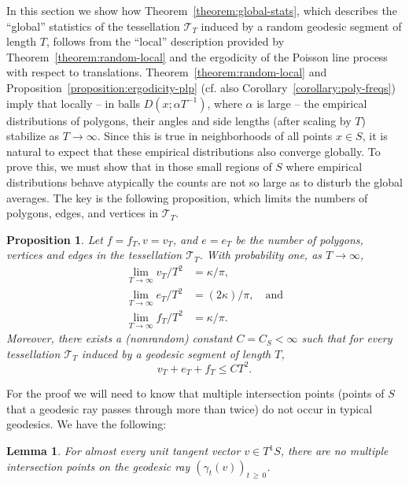\documentclass[10pt]{amsart}
\newtheorem{lemm}[theo]{Lemma}\newtheorem{prop}[theo]{Proposition}\newtheorem{coro}[theo]{Corollary}\newtheorem{conj}[theo]{Conjecture}
\theoremstyle{definition}\newtheorem{defi}[theo]{Definition}\newtheorem{rema}[theo]{Remark}\newtheorem{exam}[theo]{Example}\newtheorem{exem}[theo]{Example}\newtheorem{nota}[theo]{Notation}
\begin{document}
In this section we show how Theorem~\ref{theorem:global-stats}, which describes the ``global'' statistics of the tessellation $\mathcal{T}_{T}$ induced by a random geodesic segment of length $T$, follows from the ``local'' description provided by Theorem~\ref{theorem:random-local} and the ergodicity of the Poisson line process with respect to translations. Theorem~\ref{theorem:random-local} and Proposition~\ref{proposition:ergodicity-plp} (cf. also Corollary~\ref{corollary:poly-freqs}) imply that locally -- in balls $D (x;\alpha T^{-1})$, where $\alpha$ is large -- the empirical distributions of polygons, their angles and side lengths (after scaling by $T$) stabilize as $T \rightarrow \infty$. Since this is true in neighborhoods of all points $x\in S$, it is natural to expect that these empirical distributions also converge globally. To prove this, we must show that in those small regions of $S$ where empirical distributions behave atypically the counts are not so large as to disturb the global averages. The key is the following proposition, which limits the numbers of polygons, edges, and vertices in $\mathcal{T}_{T}$.

\begin{prop}\label{proposition:siCounts}
Let $f=f_{T}, v=v_{T}$, and $e=e_{T}$ be the number of polygons, vertices and edges in the tessellation $\mathcal{T}_{T}$. With probability one, as $T \rightarrow \infty$,
\begin{align}
\lim_{T \rightarrow \infty} v_{T}/T^{2}&=\kappa/\pi,\label{eq:vertices}
\\
\lim_{T \rightarrow \infty} e_{T}/T^{2}&= (2\kappa)/\pi, \quad \text{and}\label{eq:edges}
\\
\lim_{T \rightarrow \infty} f_{T}/T^{2}&=\kappa/\pi.\label{eq:faces}
\end{align}
Moreover, there exists a (nonrandom) constant $C=C_{S}<\infty$ such that for \emph{every} tessellation $\mathcal{T}_{T}$ induced by a geodesic segment of length $T$,
\begin{equation}\label{eq:v+e+f-bound}
v_{T}+e_{T}+f_{T}\leq CT^{2}.
\end{equation}
\end{prop}

For the proof we will need to know that multiple intersection points (points of $S$ that a geodesic ray passes through more than twice) do not occur in typical geodesics. We have the following:

\goodbreak
\begin{lemm}\label{lemma:noTriplePoints}
For almost every unit tangent vector $v\in T^1S$, there are no multiple intersection points on the geodesic ray $(\gamma_{t} (v))_{t\,\geq\,0}$.
\end{lemm}
\end{document}
